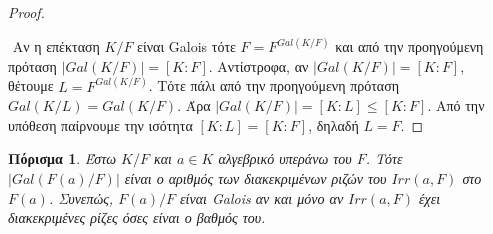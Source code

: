 \documentclass[oneside,a4paper]{article}
\newtheorem{cor}{Πόρισμα}
\newcommand {\tl}{\textlatin}
\begin{document}
\begin{proof} $ $
	
	$ $\newline
	Αν η επέκταση $K/F$ είναι \tl{Galois} τότε $F = F^{Gal(K/F)}$ και από την προηγούμενη πρόταση $|Gal(K/F)| = [K:F]$. Αντίστροφα, αν $|Gal(K/F)| = [K:F]$, θέτουμε $L = F^{Gal(K/F)}$. Τότε πάλι από την προηγούμενη πρόταση $Gal(K/L) = Gal(K/F)$. Άρα $|Gal(K/F)| = [K:L] \leq [K:F]$. Από την υπόθεση παίρνουμε την ισότητα $[K:L] = [K:F]$, δηλαδή $L = F$.

\end{proof}
\vspace{0.1cm}
\begin{cor} Έστω $K/F$ και $a\in K$ αλγεβρικό υπεράνω του $F$. Τότε $|Gal(F(a)/F)|$ είναι ο αριθμός των διακεκριμένων ριζών του $Irr(a,F)$ στο $F(a)$. Συνεπώς, $F(a)/F$ είναι \tl{Galois} αν και μόνο αν $Irr(a,F)$ έχει διακεκριμένες ρίζες όσες είναι ο βαθμός του.
\end{cor}
\end{document}
